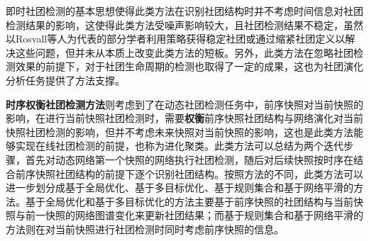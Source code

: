 即时社团检测的基本思想使得此类方法在识别社团结构时并不考虑时间信息对社团检测结果的影响，这使得此类方法受噪声影响较大，且社团检测结果不稳定，虽然以Rosvall等人\cite{rosvall2010mapping}为代表的部分学者利用策略获得稳定社团或通过缩紧社团定义以解决这些问题，但并未从本质上改变此类方法的短板。另外，此类方法在忽略社团检测效果的前提下，对于社团生命周期的检测也取得了一定的成果\cite{chen2010detecting}，这也为社团演化分析任务提供了方法支撑。
 
\textbf{时序权衡社团检测方法}则考虑到了在动态社团检测任务中，前序快照对当前快照的影响，在进行当前快照社团检测时，需要\textbf{权衡}前序快照社团结构与网络演化对当前快照社团检测的影响，但并不考虑未来快照对当前快照的影响，这也是此类方法能够实现在线社团检测的前提，也称为进化聚类。此类方法可以总结为两个迭代步骤，首先对动态网络第一个快照的网络执行社团检测，随后对后续快照按时序在结合前序快照社团结构的前提下逐个识别社团结构。按照方法的不同，此类方法可以进一步划分成基于全局优化、基于多目标优化、基于规则集合和基于网络平滑的方法。基于全局优化和基于多目标优化的方法主要基于前序快照的社团结构与当前快照与前一快照的网络图谱变化来更新社团结果；而基于规则集合和基于网络平滑的方法则在对当前快照进行社团检测时同时考虑前序快照的信息。

